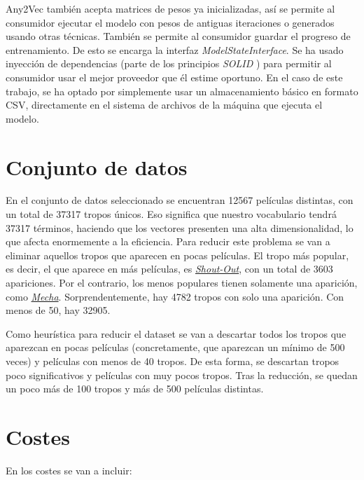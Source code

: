 Any2Vec también acepta matrices de pesos ya inicializadas, así se permite al consumidor ejecutar el modelo con pesos de antiguas iteraciones o generados usando otras técnicas. También se permite
al consumidor guardar el progreso de entrenamiento. De esto se encarga la interfaz \textit{ModelStateInterface}. Se ha usado inyección de dependencias (parte de los principios \textit{SOLID} \cite{martin2000design})
para permitir al consumidor usar el mejor proveedor que él estime oportuno. En el caso de este trabajo, se ha optado por simplemente usar un almacenamiento básico en formato CSV, directamente en el sistema de
archivos de la máquina que ejecuta el modelo.

\section{Conjunto de datos}

En el conjunto de datos seleccionado se encuentran 12567 películas distintas, con un total de 37317 tropos únicos. Eso significa que nuestro vocabulario tendrá 37317 términos, haciendo que
los vectores presenten una alta dimensionalidad, lo que afecta enormemente a la eficiencia. Para reducir este problema se van a eliminar aquellos tropos que aparecen en pocas películas.
El tropo más popular, es decir, el que aparece en más películas, es \href{https://tvtropes.org/pmwiki/pmwiki.php/Main/ShoutOut}{\textit{Shout-Out}}, con un total de 3603 apariciones.
Por el contrario, los menos populares tienen solamente una aparición, como \href{https://tvtropes.org/pmwiki/pmwiki.php/Main/Mecha}{\textit{Mecha}}. Sorprendentemente, hay 4782 tropos con solo una aparición. Con menos
de 50, hay 32905.

Como heurística para reducir el dataset se van a descartar todos los tropos que aparezcan en pocas películas (concretamente, que aparezcan un mínimo de 500 veces) y películas con menos de 40 tropos.
De esta forma, se descartan tropos poco significativos y películas con muy pocos tropos. Tras la reducción, se quedan un poco más de 100 tropos y más de 500 películas distintas.

\section{Costes}

En los costes se van a incluir:

